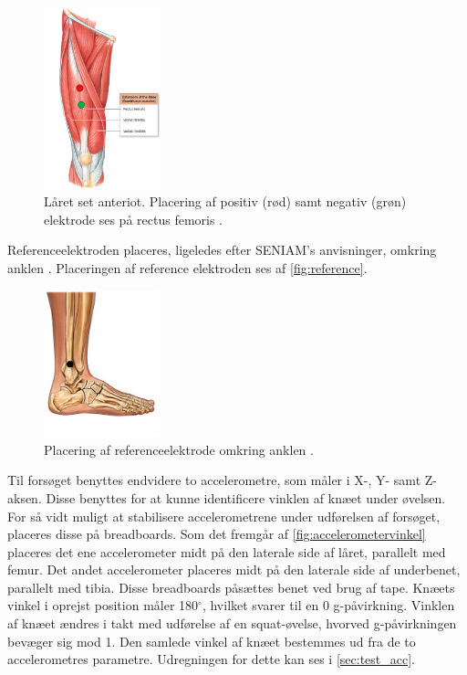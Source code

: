 \begin{figure}[H]
\centering
\includegraphics[width=0.3\textwidth]{figures/laarmuskel.png}
\caption{Låret set anteriot. Placering af positiv (rød) samt negativ (grøn) elektrode ses på rectus femoris \citep{martini2012}.}
\label{fig:laarmuskler}
\end{figure}

Referenceelektroden placeres, ligeledes efter SENIAM's anvisninger, omkring anklen \citep{seniam2016}. Placeringen af reference elektroden ses af \autoref{fig:reference}.

\begin{figure}[H]
\centering
\includegraphics[width=0.3\textwidth]{figures/reference}
\caption{Placering af referenceelektrode omkring anklen \citep{ankle2016}.}
\label{fig:reference}
\end{figure}

Til forsøget benyttes endvidere to accelerometre, som måler i X-, Y- samt Z-aksen. Disse benyttes for at kunne identificere vinklen af knæet under øvelsen. For så vidt muligt at stabilisere accelerometrene under udførelsen af forsøget, placeres disse på breadboards. 
Som det fremgår af \autoref{fig:accelerometervinkel} placeres det ene accelerometer midt på den laterale side af låret, parallelt med femur. Det andet accelerometer placeres midt på den laterale side af underbenet, parallelt med tibia. Disse breadboards påsættes benet ved brug af tape. Knæets vinkel i oprejst position måler 180$^{\circ}$, hvilket svarer til en 0 g-påvirkning. Vinklen af knæet ændres i takt med udførelse af en squat-øvelse, hvorved g-påvirkningen bevæger sig mod 1. Den samlede vinkel af knæet bestemmes ud fra de to accelerometres parametre. Udregningen for dette kan ses i \autoref{sec:test_acc}.

